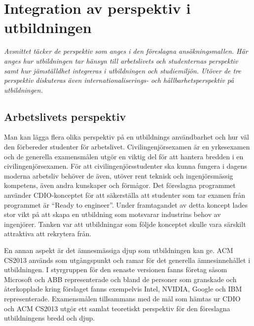 \chapter{Integration av perspektiv i utbildningen\label{ch:perspektiv}}

\begin{tcbdoublebox}
\emph{Avsnittet täcker de perspektiv som anges i den föreslagna ansökningsmallen. Här anges hur utbildningen tar hänsyn till arbetslivets och studenternas perspektiv samt hur jämställdhet integreras i utbildningen och studiemiljön. Utöver de tre perspektiv diskuteras även internationaliserings- och hållbarhetsperspektiv på utbildningen.}
\end{tcbdoublebox}

\section{Arbetslivets perspektiv}

Man kan lägga flera olika perspektiv på en utbildnings användbarhet och hur väl den förbereder studenter för arbetslivet. Civilingenjörsexamen är en yrkesexamen och de generella examensmålen utgör en viktig del för att hantera bredden i en civilingenjörsexamen. För att civilingenjörsstudenter ska kunna fungera i dagens moderna arbetsliv behöver de även, utöver rent teknisk och ingenjörsmässig kompetens, även andra kunskaper och förmågor. Det föreslagna programmet använder CDIO-konceptet för att säkerställa att studenter som tar examen från programmet är ``Ready to engineer''. Under framtagandet av detta koncept lades stor vikt på att skapa en utbildning som motsvarar industrins behov av ingenjörer. Tanken var att utbildningar som följde konceptet skulle vara särskilt attraktiva att rekrytera från.

En annan aspekt är det ämnesmässiga djup som utbildningen kan ge. ACM CS2013 används som utgångspunkt och ramar för det generella ämnesinnehållet i utbildningen. I styrgruppen för den senaste versionen fanns företag såsom Microsoft och ABB representerade och bland de personer som granskade och återkopplade kring förslaget fanns exempelvis Intel, NVIDIA, Google och IBM representerade. Examensmålen tillsammans med de mål som hämtas ur CDIO och ACM CS2013 utgör ett samlat teoretiskt perspektiv för den föreslagna utbildningens bredd och djup.

